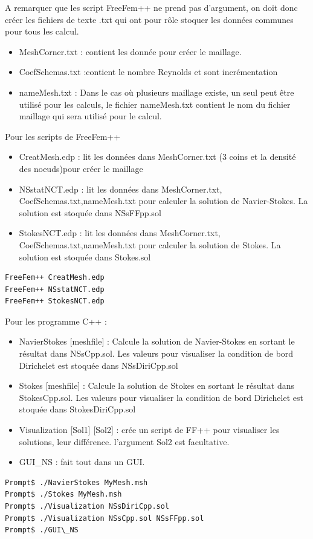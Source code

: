 \documentclass{book}
\begin{document}
A remarquer que les script FreeFem++ ne prend pas d'argument, on doit donc créer les fichiers de texte .txt qui ont pour rôle stoquer les données communes pour tous les calcul. 
\begin{itemize}
 \item MeshCorner.txt : contient les donnée pour créer le maillage.
 \item CoefSchemas.txt :contient le nombre Reynolds et sont incrémentation 
 \item nameMesh.txt : Dans le cas où plusieurs maillage existe, un seul peut être utilisé pour les calculs, le fichier nameMesh.txt contient le nom du fichier maillage qui sera utilisé pour le calcul.
\end{itemize}
Pour les scripts de FreeFem++
\begin{itemize}
 \item CreatMesh.edp : lit les données dans MeshCorner.txt (3 coins et la densité des noeuds)pour créer le maillage
 \item NSstatNCT.edp : lit les données dans MeshCorner.txt, CoefSchemas.txt,nameMesh.txt pour calculer la solution de Navier-Stokes. La solution est stoquée dans NSsFFpp.sol
 \item StokesNCT.edp : lit les données dans MeshCorner.txt, CoefSchemas.txt,nameMesh.txt pour calculer la solution de Stokes. La solution est stoquée dans Stokes.sol
\end{itemize}
\begin{lstlisting}
FreeFem++ CreatMesh.edp 
FreeFem++ NSstatNCT.edp 
FreeFem++ StokesNCT.edp  
\end{lstlisting}
Pour les programme C++ :
\begin{itemize}
 \item NavierStokes [meshfile] : Calcule la solution de Navier-Stokes en sortant le résultat dans NSsCpp.sol. Les valeurs pour visualiser la condition de bord Dirichelet est stoquée dans NSsDiriCpp.sol
 \item Stokes [meshfile] : Calcule la solution de Stokes en sortant le résultat dans StokesCpp.sol. Les valeurs pour visualiser la condition de bord Dirichelet est stoquée dans StokesDiriCpp.sol
 \item Visualization [Sol1] [Sol2] : crée un script de FF++ pour visualiser les solutions, leur différence. l'argument Sol2 est facultative. 
 \item GUI\_NS : fait tout dans un GUI.
\end{itemize}
\begin{lstlisting}
Prompt$ ./NavierStokes MyMesh.msh
Prompt$ ./Stokes MyMesh.msh
Prompt$ ./Visualization NSsDiriCpp.sol
Prompt$ ./Visualization NSsCpp.sol NSsFFpp.sol
Prompt$ ./GUI\_NS
\end{lstlisting}
\end{document}

